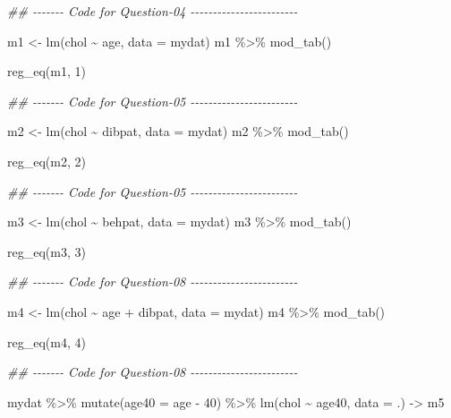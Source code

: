 \documentclass[
  12pt,
  oneside]{article}
\newenvironment{Shaded}{}{}
\newcommand{\AttributeTok}[1]{\textcolor[rgb]{0.49,0.56,0.16}{#1}}
\newcommand{\DecValTok}[1]{\textcolor[rgb]{0.25,0.63,0.44}{#1}}
\newcommand{\DocumentationTok}[1]{\textcolor[rgb]{0.73,0.13,0.13}{\textit{#1}}}
\newcommand{\FunctionTok}[1]{\textcolor[rgb]{0.02,0.16,0.49}{#1}}
\newcommand{\NormalTok}[1]{#1}
\newcommand{\OtherTok}[1]{\textcolor[rgb]{0.00,0.44,0.13}{#1}}
\newcommand{\SpecialCharTok}[1]{\textcolor[rgb]{0.25,0.44,0.63}{#1}}
\begin{document}
\begin{Shaded}
\begin{Highlighting}[]
\DocumentationTok{\#\# {-}{-}{-}{-}{-}{-}{-} Code for Question{-}04 {-}{-}{-}{-}{-}{-}{-}{-}{-}{-}{-}{-}{-}{-}{-}{-}{-}{-}{-}{-}{-}{-}{-}{-}}

\NormalTok{m1 }\OtherTok{\textless{}{-}} \FunctionTok{lm}\NormalTok{(chol }\SpecialCharTok{\textasciitilde{}}\NormalTok{ age, }\AttributeTok{data =}\NormalTok{ mydat)}
\NormalTok{m1 }\SpecialCharTok{\%\textgreater{}\%} \FunctionTok{mod\_tab}\NormalTok{()}

\FunctionTok{reg\_eq}\NormalTok{(m1, }\DecValTok{1}\NormalTok{)}

\DocumentationTok{\#\# {-}{-}{-}{-}{-}{-}{-} Code for Question{-}05 {-}{-}{-}{-}{-}{-}{-}{-}{-}{-}{-}{-}{-}{-}{-}{-}{-}{-}{-}{-}{-}{-}{-}{-}}

\NormalTok{m2 }\OtherTok{\textless{}{-}} \FunctionTok{lm}\NormalTok{(chol }\SpecialCharTok{\textasciitilde{}}\NormalTok{ dibpat, }\AttributeTok{data =}\NormalTok{ mydat)}
\NormalTok{m2 }\SpecialCharTok{\%\textgreater{}\%} \FunctionTok{mod\_tab}\NormalTok{()}

\FunctionTok{reg\_eq}\NormalTok{(m2, }\DecValTok{2}\NormalTok{)}

\DocumentationTok{\#\# {-}{-}{-}{-}{-}{-}{-} Code for Question{-}05 {-}{-}{-}{-}{-}{-}{-}{-}{-}{-}{-}{-}{-}{-}{-}{-}{-}{-}{-}{-}{-}{-}{-}{-}}

\NormalTok{m3 }\OtherTok{\textless{}{-}} \FunctionTok{lm}\NormalTok{(chol }\SpecialCharTok{\textasciitilde{}}\NormalTok{ behpat, }\AttributeTok{data =}\NormalTok{ mydat)}
\NormalTok{m3 }\SpecialCharTok{\%\textgreater{}\%} \FunctionTok{mod\_tab}\NormalTok{()}

\FunctionTok{reg\_eq}\NormalTok{(m3, }\DecValTok{3}\NormalTok{)}

\DocumentationTok{\#\# {-}{-}{-}{-}{-}{-}{-} Code for Question{-}08 {-}{-}{-}{-}{-}{-}{-}{-}{-}{-}{-}{-}{-}{-}{-}{-}{-}{-}{-}{-}{-}{-}{-}{-}}

\NormalTok{m4 }\OtherTok{\textless{}{-}} \FunctionTok{lm}\NormalTok{(chol }\SpecialCharTok{\textasciitilde{}}\NormalTok{ age }\SpecialCharTok{+}\NormalTok{ dibpat, }\AttributeTok{data =}\NormalTok{ mydat)}
\NormalTok{m4 }\SpecialCharTok{\%\textgreater{}\%} \FunctionTok{mod\_tab}\NormalTok{()}

\FunctionTok{reg\_eq}\NormalTok{(m4, }\DecValTok{4}\NormalTok{)}

\DocumentationTok{\#\# {-}{-}{-}{-}{-}{-}{-} Code for Question{-}08 {-}{-}{-}{-}{-}{-}{-}{-}{-}{-}{-}{-}{-}{-}{-}{-}{-}{-}{-}{-}{-}{-}{-}{-}}

\NormalTok{mydat }\SpecialCharTok{\%\textgreater{}\%}
  \FunctionTok{mutate}\NormalTok{(}\AttributeTok{age40 =}\NormalTok{ age }\SpecialCharTok{{-}} \DecValTok{40}\NormalTok{) }\SpecialCharTok{\%\textgreater{}\%}
  \FunctionTok{lm}\NormalTok{(chol }\SpecialCharTok{\textasciitilde{}}\NormalTok{ age40, }\AttributeTok{data =}\NormalTok{ .) }\OtherTok{{-}\textgreater{}}\NormalTok{ m5}


\end{Highlighting}
\end{Shaded}
\end{document}
